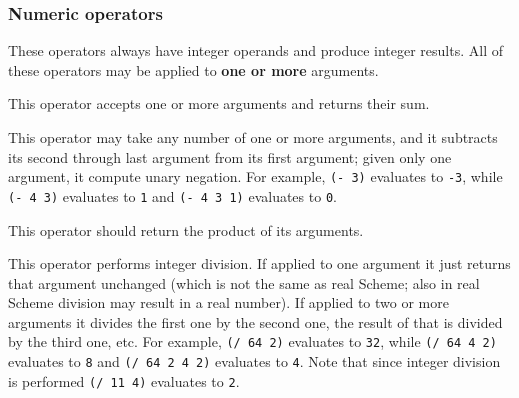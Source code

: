 \documentclass[11pt]{article}
\begin{document}
      \subsubsection{Numeric operators}

        These operators always have integer operands and produce integer
      results.  All of these operators may be applied to \textbf{one or
      more} arguments.

        \vspace{-2.5mm}

        \begin{description}

          \addtolength{\itemsep}{-.5mm}

          \item[\texttt{+}:] This operator accepts one or more arguments and
                returns their sum.

          \item[\texttt{-}:] This operator may take any number of one or
                more arguments, and it subtracts its second through last
                argument from its first argument; given only one argument,
                it compute unary negation.  For example, \texttt{(- 3)}
                evaluates to \texttt{-3}, while \texttt{(- 4 3)} evaluates
                to \texttt{1} and \texttt{(- 4 3 1)} evaluates to
                \texttt{0}.

          \item[\texttt{*}:] This operator should return the product of its
               arguments.

          \item[\texttt{/}:] This operator performs integer division.  If
                applied to one argument it just returns that argument
                unchanged (which is not the same as real Scheme; also in
                real Scheme division may result in a real number).  If
                applied to two or more arguments it divides the first one by
                the second one, the result of that is divided by the third
                one, etc.  For example, \texttt{(/ 64 2)} evaluates to
                \texttt{32}, while \texttt{(/ 64 4 2)} evaluates to
                \texttt{8} and \texttt{(/ 64 2 4 2)} evaluates to
                \texttt{4}.  Note that since integer division is performed
                \texttt{(/ 11 4)} evaluates to \texttt{2}.

        \end{description}
\end{document}

